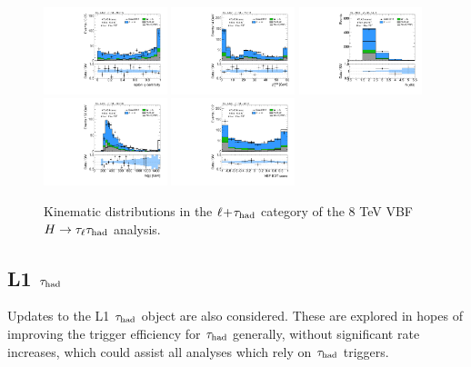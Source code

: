 \begin{figure}[tp]
  \includegraphics[width=0.32\textwidth]{figures/vbf-LTT/lep-eta-centrality}
  \includegraphics[width=0.32\textwidth]{figures/vbf-LTT/system-pt}
  \includegraphics[width=0.32\textwidth]{figures/vbf-LTT/n-jets30}
  \includegraphics[width=0.32\textwidth]{figures/vbf-LTT/dijet-m-high}
  \includegraphics[width=0.32\textwidth]{figures/vbf-LTT/BDTEve-VBF}
  \caption{Kinematic distributions in the $\ell\!+\!\tau_\text{had}$ category of the 8 TeV VBF $H\rightarrow\tau_\ell\tau_\text{had}$ analysis.}
  \label{fig:prospects-ltt-jets}
\end{figure}
\clearpage

\subsection{L1 $\tau_\text{had}$}

Updates to the L1 $\tau_\text{had}$ object are also considered. These are explored in hopes of improving the trigger efficiency for $\tau_\text{had}$ generally, without significant rate increases, which could assist all analyses which rely on $\tau_\text{had}$ triggers.

